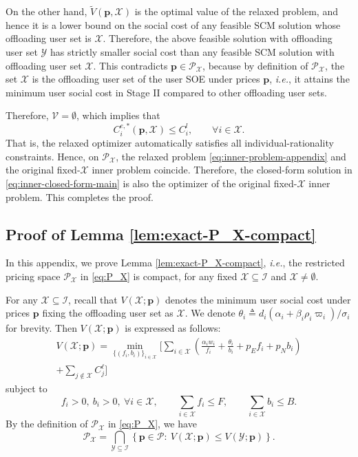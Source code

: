 \documentclass[lettersize,journal]{IEEEtran}
\newcommand{\ie}{\emph{i.e.}}
\begin{document}
On the other hand, $\widetilde V(\boldsymbol p,\mathcal X)$ is the optimal value of the relaxed problem, and hence it is a lower bound on the social cost of any feasible SCM solution whose offloading user set is $\mathcal X$.
Therefore, the above feasible solution with offloading user set $\mathcal Y$ has strictly smaller social cost than any feasible SCM solution with offloading user set $\mathcal X$.
This contradicts $\boldsymbol p\in\mathcal P_{\mathcal X}$, because by definition of $\mathcal P_{\mathcal X}$, the set $\mathcal X$ is the offloading user set of the user SOE under prices $\boldsymbol p$, \ie, it attains the minimum user social cost in Stage II compared to other offloading user sets.

Therefore, $\mathcal V=\emptyset$, which implies that
\[
C_i^{e,*}(\boldsymbol p,\mathcal X)\le C_i^l,
\qquad \forall i\in\mathcal X.
\]
That is, the relaxed optimizer automatically satisfies all individual-rationality constraints.
Hence, on $\mathcal P_{\mathcal X}$, the relaxed problem \eqref{eq:inner-problem-appendix} and the original fixed-$\mathcal X$ inner problem coincide.
Therefore, the closed-form solution in \eqref{eq:inner-closed-form-main} is also the optimizer of the original fixed-$\mathcal X$ inner problem.
This completes the proof.

\subsection{Proof of Lemma \ref{lem:exact-P_X-compact}}\label{proof:exact-P_X-compact}
In this appendix, we prove Lemma \ref{lem:exact-P_X-compact}, \ie, the restricted pricing space $\mathcal{P}_{\mathcal{X}}$ in \eqref{eq:P_X} is compact, for any fixed $\mathcal{X}\subseteq\mathcal{I}$ and $\mathcal{X}\ne\emptyset$.

For any $\mathcal X\subseteq \mathcal I$, recall that $V(\mathcal{X};\boldsymbol{p})$ denotes the minimum user social cost under prices $\boldsymbol{p}$ fixing the offloading user set as $\mathcal{X}$. We denote $\theta_i\triangleq d_i(\alpha_i+\beta_i\rho_i\varpi_i)/\sigma_i$ for brevity. Then $V(\mathcal{X};\boldsymbol{p})$ is expressed as follows:
\begin{align*}
    V({\mathcal X};\boldsymbol{p})
=
\min_{\{(f_i,b_i)\}_{i\in\mathcal X}}
\Bigg[
\sum_{i\in\mathcal X}
\left(
\frac{\alpha_i w_i}{f_i}
+\frac{\theta_i}{b_i}
+p_E f_i+p_N b_i
\right)\\
+\sum_{j\notin\mathcal X} C_j^\ell
\Bigg]
\end{align*}
subject to
\[
f_i>0,\ b_i>0,\ \forall i\in\mathcal X,\qquad
\sum_{i\in\mathcal X} f_i\le F,\qquad
\sum_{i\in\mathcal X} b_i\le B.
\]
By the definition of $\mathcal{P}_{\mathcal{X}}$ in \eqref{eq:P_X}, we have
\[
\mathcal P_{\mathcal X}
=
\bigcap_{\mathcal Y\subseteq\mathcal I}
\left\{
\boldsymbol{p}\in\mathcal P:\ V({\mathcal X};\boldsymbol{p})\le V({\mathcal Y};\boldsymbol{p})
\right\}.
\]
\end{document}
